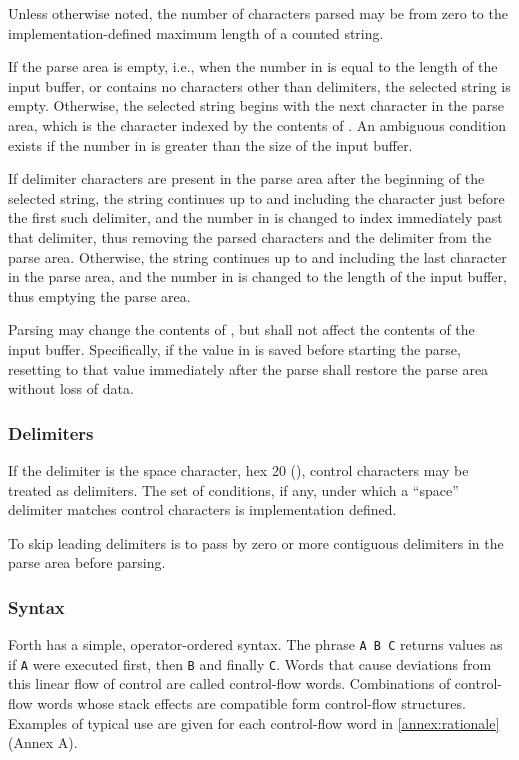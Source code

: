 Unless otherwise noted, the number of characters parsed may be from
zero to the implementation-defined maximum length of a counted
string.

If the parse area is empty, i.e., when the number in  is
equal to the length of the input buffer, or contains no characters
other than delimiters, the selected string is empty. Otherwise, the
selected string begins with the next character in the parse area,
which is the character indexed by the contents of . An
ambiguous condition exists if the number in  is greater
than the size of the input buffer.

If delimiter characters are present in the parse area after the
beginning of the selected string, the string continues up to and
including the character just before the first such delimiter, and
the number in  is changed to index immediately past that
delimiter, thus removing the parsed characters and the delimiter
from the parse area. Otherwise, the string continues up to and
including the last character in the parse area, and the number in
 is changed to the length of the input buffer, thus
emptying the parse area.

Parsing may change the contents of , but shall not affect
the contents of the input buffer. Specifically, if the value in
 is saved before starting the parse, resetting 
to that value immediately after the parse shall restore the parse
area without loss of data.

\subsubsection{Delimiters} %
\label{usage:delim}

If the delimiter is the space character, hex 20 (), control
characters may be treated as delimiters. The set of conditions, if
any, under which a ``space'' delimiter matches control characters is
implementation defined.

To skip leading delimiters is to pass by zero or more contiguous
delimiters in the parse area before parsing.

\subsubsection{Syntax} %
\label{usage:syntax}

Forth has a simple, operator-ordered syntax. The phrase
\texttt{A B C} returns values as if \texttt{A} were executed first,
then \texttt{B} and finally \texttt{C}. Words that cause deviations
from this linear flow of control are called control-flow words.
Combinations of control-flow words whose stack effects are
compatible form control-flow structures. Examples of typical use are
given for each control-flow word in \ref{annex:rationale} (Annex A).


